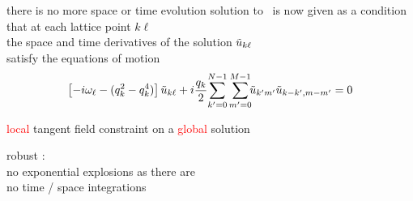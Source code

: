 \begin{frame}{there is no more space or time evolution}
solution to \KS\ is now given as
a condition that at each lattice point        \hspace{24ex}  $k\ell$ \\
the space and time derivatives of the solution \hspace{6ex}  $\tilde{u}_{k\ell}$ \\
satisfy the equations of motion
\[
\left[- i \omega_\ell - ( q_k^2 - q_k^4 ) \right]\tilde{u}_{k\ell}
+ i \frac{q_k}{2} \!\sum_{k'=0}^{N-1} \sum^{M-1}_{m'=0}\!\!
\tilde{u}_{k'm'} \tilde{u}_{k-k',m-m'}
    =
0
\]

\bigskip
{\huge \textcolor{red}{local}} tangent field constraint on a
{\huge \textcolor{red}{global}} solution

\bigskip

robust : \\
no exponential explosions as there are \\
no time / space integrations

\end{frame}

%
%
%
%
%



